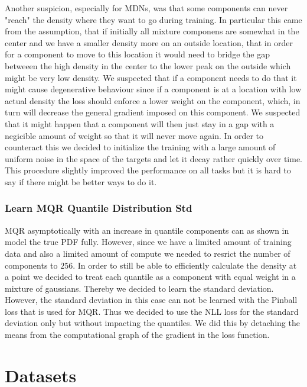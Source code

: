Another suspicion, especially for MDNs, was that some components can never "reach" the density where they want to go during training. In particular this came from the assumption, that if initially all mixture componens are somewhat in the center and we have a smaller density more on an outside location, that in order for a component to move to this location it would need to bridge the gap betweeen the high density in the center to the lower peak on the outside which might be very low density. We suspected that if a component needs to do that it might cause degenerative behaviour since if a component is at a location with low actual density the loss should enforce a lower weight on the component, which, in turn will decrease the general gradient imposed on this component. We suspected that it might happen that a component will then just stay in a gap with a negicible amount of weight so that it will never move again. In order to counteract this we decided to initialize the training with a large amount of uniform noise in the space of the targets and let it decay rather quickly over time. This procedure slightly improved the performance on all tasks but it is hard to say if there might be better ways to do it.

\subsubsection{Learn MQR Quantile Distribution Std}

MQR asymptotically with an increase in quantile components can as shown in  model the true PDF fully. However, since we have a limited amount of training data and also a limited amount of compute we needed to resrict the number of components to $256$. In order to still be able to efficiently calculate the density at a point we decided to treat each quantile as a component with equal weight in a mixture of gaussians. Thereby we decided to learn the standard deviation. However, the standard deviation in this case can not be learned with the Pinball loss that is used for MQR. Thus we decided to use the NLL loss for the standard deviation only but without impacting the quantiles. We did this by detaching the means from the computational graph of the gradient in the loss function.

\section{Datasets}

